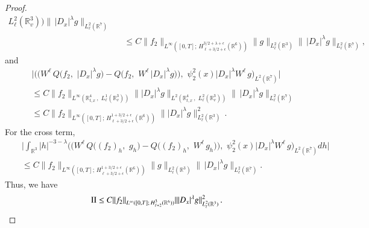 \documentclass{amsart}[12pt, article]
\begin{document}
\begin{proof}
\begin{eqnarray*}
{L^2_{\ell}({{{\mathbb R}}}^3_v))} \|\,|D_{x}|^{\lambda} g\|_{L^2_{\ell
}({{{\mathbb R}}}^7)}\\
&&\leq C\|f_2\|_{L^\infty ([0, T];\,
H^{3/2+\lambda+\epsilon}_{\ell+3/2+\epsilon}({{{\mathbb R}}}^6))}
\|g\|_{L^2_{\ell}({{{\mathbb R}}}^3)} \|\,|D_{x}|^{\lambda} g\|_{L^2_{\ell
}({{{\mathbb R}}}^7)},
\end{eqnarray*}
and
\begin{eqnarray*}
&&\Big|\Big(\big( W^{\ell}\, Q\big(f_2,\,\,
|D_{x}|^{\lambda}g\big)-Q\big(f_2,\,\, W^{\ell}\,|D_{x}|^{\lambda}
g\big)\big) ,\,\,
\psi^2_2(x)|D_{x}|^{\lambda} W^{\ell}\,g\Big)_{L^2({{{\mathbb R}}}^7)}\Big|\\
&&\leq C\|f_2\|_{L^\infty({{{\mathbb R}}}^4_{t, x}\,, \,\, L^1_{\ell}({{{\mathbb R}}}^3_v))}
\||D_{x}|^{\lambda}g\|_{L^2({{{\mathbb R}}}^4_{t, x}\,, \,\,
L^2_{\ell}({{{\mathbb R}}}^3_v))} \|\,|D_{x}|^{\lambda} g\|_{L^2_{\ell
}({{{\mathbb R}}}^7)}\\
&&\leq C\|f_2\|_{L^\infty ([0, T];\,
H^{1+3/2+\epsilon}_{\ell+3/2+\epsilon}({{{\mathbb R}}}^6))}
\||D_{x}|^{\lambda}g\|^2_{L^2_{\ell}({{{\mathbb R}}}^3)}\, .
\end{eqnarray*}
For the cross term,
\begin{eqnarray*}
&&\Big|\int_{{{{\mathbb R}}}^3} |h|^{-3-\lambda}\Big( \big( W^{\ell}\,
Q\big((f_2)_h,\,\, g_h\big)-Q\big((f_2)_h,\,\, W^{\ell}\,
g_h\big)\big) ,\,\, \psi^2_2(x)|D_{x}|^{\lambda}
W^{\ell}\,g\Big)_{L^2({{{\mathbb R}}}^7)}d h\Big|\\
&&\leq C\|f_2\|_{L^\infty ([0, T];\,
H^{1+3/2+\epsilon}_{\ell+3/2+\epsilon}({{{\mathbb R}}}^6))}
\|g\|_{L^2_{\ell}({{{\mathbb R}}}^3)} \|\,|D_{x}|^{\lambda} g\|_{L^2_{\ell
}({{{\mathbb R}}}^7)}.
\end{eqnarray*}
Thus, we have
$$
{\rm II}\leq C\|f_2\|_{L^\infty ([0, T];\, H^{3}_{\ell+2}({{{\mathbb R}}}^6))}
\||D_{x}|^{\lambda}g\|^2_{L^2_{\ell}({{{\mathbb R}}}^3)}\, .
$$


\end{proof}
\end{document}
